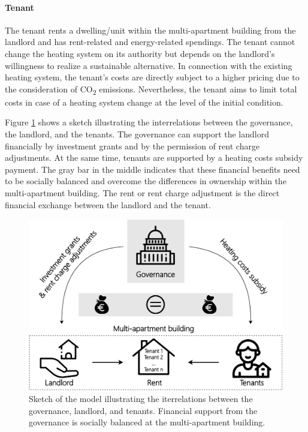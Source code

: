 \paragraph{Tenant} The tenant rents a dwelling/unit within the multi-apartment building from the landlord and has rent-related and energy-related spendings. The tenant cannot change the heating system on its authority but depends on the landlord's willingness to realize a sustainable alternative. In connection with the existing heating system, the tenant's costs are directly subject to a higher pricing due to the consideration of CO\textsubscript{2} emissions. Nevertheless, the tenant aims to limit total costs in case of a heating system change at the level of the initial condition.\vspace{0.5cm}

Figure \ref{fig:methodology} shows a sketch illustrating the interrelations between the governance, the landlord, and the tenants. The governance can support the landlord financially by investment grants and by the permission of rent charge adjustments. At the same time, tenants are supported by a heating costs subsidy payment. The gray bar in the middle indicates that these financial benefits need to be socially balanced and overcome the differences in ownership within the multi-apartment building. The rent or rent charge adjustment is the direct financial exchange between the landlord and the tenant.\vspace{0.5cm}

\begin{figure}[h]
	\centering
	\includegraphics[width=0.7\linewidth]{figures/3_Methodology/Sketch.pdf}
	\caption{Sketch of the model illustrating the iterrelations between the governance, landlord, and tenants. Financial support from the governance is socially balanced at the multi-apartment building.}
	\label{fig:methodology}
\end{figure}

